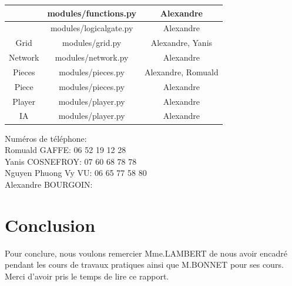\documentclass[a4paper]{report}
\begin{document}
\begin{center}
\begin{tabular}{|c|c|c|}
&	      					modules/functions.py&      	Alexandre\\\hline
&      						modules/logicalgate.py&     Alexandre\\\hline
Grid&      					modules/grid.py&      		Alexandre, Yanis\\\hline
Network&      				modules/network.py&      	Alexandre\\\hline
Pieces&      				modules/pieces.py&      	Alexandre, Romuald\\\hline
Piece&      				modules/pieces.py&      	Alexandre\\\hline
Player&      				modules/player.py&      	Alexandre\\\hline
IA&      					modules/player.py&      	Alexandre\\\hline
\end{tabular}\end{center}

Numéros de téléphone: \\
Romuald GAFFE: 06 52 19 12 28\\
Yanis COSNEFROY: 07 60 68 78 78\\
Nguyen Phuong Vy VU: 06 65 77 58 80\\
Alexandre BOURGOIN: \


\part{Conclusion}
Pour conclure, nous voulons remercier Mme.LAMBERT de nous avoir encadré pendant les cours de travaux pratiques ainsi que M.BONNET pour ses cours. Merci d'avoir pris le temps de lire ce rapport. \\
\end{document}
